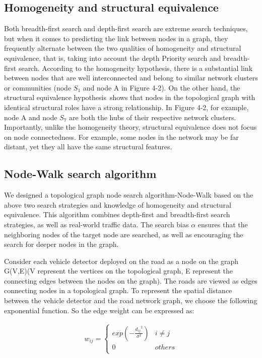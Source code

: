 \documentclass[conference]{IEEEtran}
\begin{document}
\subsection{Homogeneity and structural equivalence}
\par
Both breadth-first search and depth-first search are extreme search techniques, but when it comes to predicting the link between nodes in a graph, they frequently alternate between the two qualities of homogeneity and structural equivalence, that is, taking into account the depth Priority search and breadth-first search. According to the homogeneity hypothesis, there is a substantial link between nodes that are well interconnected and belong to similar network clusters or communities (node $S_1$ and node A in Figure 4-2). On the other hand, the structural equivalence hypothesis shows that nodes in the topological graph with identical structural roles have a strong relationship. In Figure 4-2, for example, node A and node $S_7$ are both the hubs of their respective network clusters. Importantly, unlike the homogeneity theory, structural equivalence does not focus on node connectedness. For example, some nodes in the network may be far distant, yet they all have the same structural features.

\subsection{Node-Walk search algorithm}
\par
We designed a topological graph node search algorithm-Node-Walk based on the above two search strategies and knowledge of homogeneity and structural equivalence. This algorithm combines depth-first and breadth-first search strategies, as well as real-world traffic data. The search bias $\alpha$ ensures that the neighboring nodes of the target node are searched, as well as encouraging the search for deeper nodes in the graph. 
\par
Consider each vehicle detector deployed on the road as a node on the graph G(V,E)(V represent the vertices on the topological graph, E represent the connecting edges between the nodes on the graph). The roads are viewed as edges connecting nodes in a topological graph. To represent the spatial distance between the vehicle detector and the road network graph, we choose the following exponential function. So the edge weight can be expressed as:

\begin{eqnarray}
w_{ij} =
\begin{cases}
exp	\left( -{\frac{{d_{ij}}^2}{\sigma ^2}} \right)   & i\neq j \\
0  & others \\
\end{cases}
\end{eqnarray}  
\end{document}
